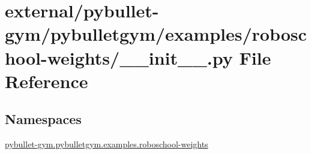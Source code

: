\hypertarget{external_2pybullet-gym_2pybulletgym_2examples_2roboschool-weights_2____init_____8py}{}\section{external/pybullet-\/gym/pybulletgym/examples/roboschool-\/weights/\+\_\+\+\_\+init\+\_\+\+\_\+.py File Reference}
\label{external_2pybullet-gym_2pybulletgym_2examples_2roboschool-weights_2____init_____8py}
\subsection*{Namespaces}
\begin{DoxyCompactItemize}
\item 
 \hyperlink{namespacepybullet-gym_1_1pybulletgym_1_1examples_1_1roboschool-weights}{pybullet-\/gym.\+pybulletgym.\+examples.\+roboschool-\/weights}
\end{DoxyCompactItemize}
